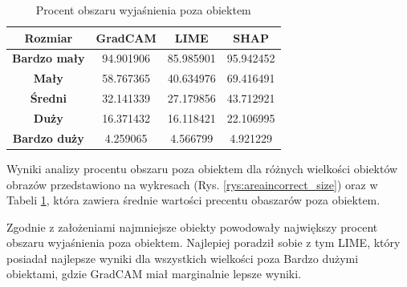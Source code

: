 \begin{table}[h]
	\centering
	\begin{tabular}{|c|c|c|c|}
		\hline
		\textbf{Rozmiar}     & \textbf{GradCAM} & \textbf{LIME} & \textbf{SHAP} \\
		\hline
		\textbf{Bardzo mały} & 94.901906        & 85.985901     & 95.942452     \\
		\hline
		\textbf{Mały}        & 58.767365        & 40.634976     & 69.416491     \\
		\hline
		\textbf{Średni}      & 32.141339        & 27.179856     & 43.712921     \\
		\hline
		\textbf{Duży}        & 16.371432        & 16.118421     & 22.106995     \\
		\hline
		\textbf{Bardzo duży} & 4.259065         & 4.566799      & 4.921229      \\
		\hline
	\end{tabular}
	\caption{Procent obszaru wyjaśnienia poza obiektem}
	\label{tab:size_area}
\end{table}

Wyniki analizy procentu obszaru poza obiektem dla różnych wielkości obiektów obrazów przedstawiono na wykresach (Rys. \ref{rys:areaincorrect_size}) oraz w Tabeli \ref{tab:size_area}, która zawiera średnie wartości precentu obaszarów poza obiektem.

Zgodnie z założeniami najmniejsze obiekty powodowały największy procent obszaru wyjaśnienia poza obiektem.
Najlepiej poradził sobie z tym LIME, który posiadał najlepsze wyniki dla wszystkich wielkości poza Bardzo dużymi obiektami, gdzie GradCAM miał marginalnie lepsze wyniki.

\vspace{1cm}

